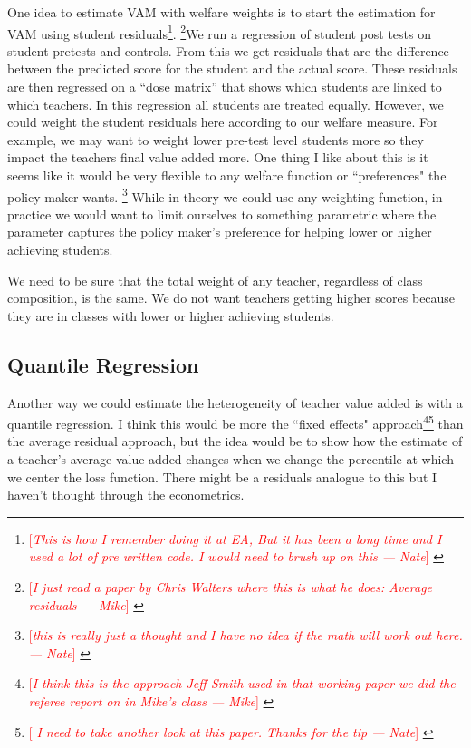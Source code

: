 \documentclass[letterpaper,12pt]{article}
\newcommand\cmnt[2]{\;
{\textcolor{red}{[{\em #1 --- #2}] \;}
}}
\newcommand\Natenote[1]{\footnote{\cmnt{#1}{Nate}}}
\newcommand\Mikenote[1]{\footnote{\cmnt{#1}{Mike}}}
\begin{document}
One idea to estimate VAM with welfare weights is to start the estimation for VAM using student residuals\Natenote{This is how I remember doing it at EA, But it has been a long time and I used a lot of pre written code. I would need to brush up on this}. \Mikenote{I just read a paper by Chris Walters where this is what he does: Average residuals}We run a regression of student post tests on student pretests and controls. From this we get residuals that are the difference between the predicted score for the student and the actual score. These residuals are then regressed on a ``dose matrix'' that shows which students are linked to which teachers. In this regression all students are treated equally. However, we could weight the student residuals here according to our welfare measure. For example, we may want to weight lower pre-test level students more so they impact the teachers final value added more. One thing I like about this is it seems like it would be very flexible to any welfare function or ``preferences" the policy maker wants. \Natenote{this is really just a thought and I have no idea if the math will work out here.} While in theory we could use any weighting function, in practice we would want to limit ourselves to something parametric where the parameter captures the policy maker's preference for helping lower or higher achieving students. 

We need to be sure that the total weight of any teacher, regardless of class composition, is the same. We do not want teachers getting higher scores because they are in classes with lower or higher achieving students.





\subsection{Quantile Regression}

Another way we could estimate the heterogeneity of teacher value added is with a quantile regression. I think this would be more the ``fixed effects" approach\Mikenote{I think this is the approach Jeff Smith used in that working paper we did the referee report on in Mike's class}\Natenote{ I need to take another look at this paper. Thanks for the tip } than the average residual approach, but the idea would be to show how the estimate of a teacher's average value added changes when we change the percentile at which we center the loss function. There might be a residuals analogue to this but I haven't thought through the econometrics. 
\end{document}
